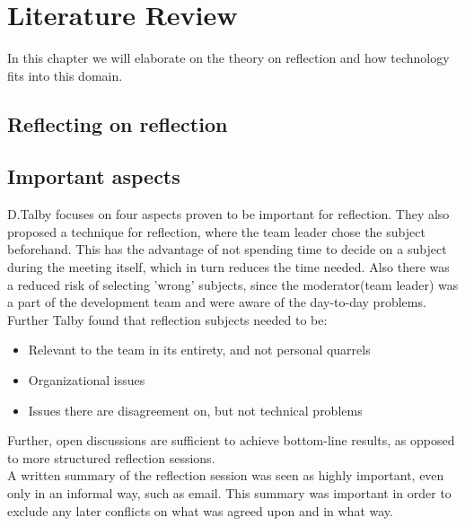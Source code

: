 \section{Literature Review}
\label{sec:literaturereview}
In this chapter we will elaborate on the theory on reflection and how technology fits into this domain. 

\subsection{Reflecting on reflection}
\subsection*{Important aspects}
D.Talby \citep{Talby2006} focuses on four aspects proven to be important for reflection. They also proposed a technique for reflection, where the team leader chose the subject beforehand. This has the advantage of not spending time to decide on a subject during the meeting itself, which in turn reduces the time needed. Also there was a reduced risk of selecting 'wrong' subjects, since the moderator(team leader) was a part of the development team and were aware of the day-to-day problems.\\
Further Talby found that reflection subjects needed to be:
\begin{itemize}
\item Relevant to the team in its entirety, and not personal quarrels
\item Organizational issues
\item Issues there are disagreement on, but not technical problems
\end{itemize}
Further, open discussions are sufficient to achieve bottom-line results, as opposed to more structured reflection sessions.\\
A written summary of the reflection session was seen as highly important, even only in an informal way, such as email. This summary was important in order to exclude any later conflicts on what was agreed upon and in what way.
